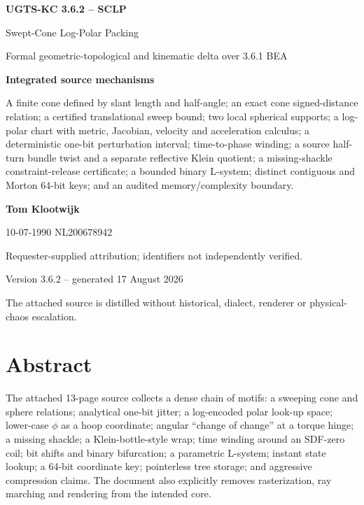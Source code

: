 \documentclass[10pt,a4paper]{article}
\begin{document}

\begin{titlepage}
\pagecolor{UGTSNavy}
\color{white}
\vspace*{9mm}
{\sffamily\bfseries\fontsize{34}{39}\selectfont UGTS-KC 3.6.2 -- SCLP\par}
\vspace{4mm}
{\sffamily\fontsize{21}{25}\selectfont Swept-Cone Log-Polar Packing\par}
\vspace{6mm}
{\sffamily\large Formal geometric-topological and kinematic delta over 3.6.1 BEA\par}
\vspace{12mm}

\begin{tcolorbox}[enhanced,colback=white,colframe=UGTSTeal,boxrule=1.2pt,arc=2mm,left=5mm,right=5mm,top=4mm,bottom=4mm]
\color{UGTSDark}
\textbf{Integrated source mechanisms}\par
A finite cone defined by slant length and half-angle; an exact cone signed-distance relation; a certified translational sweep bound; two local spherical supports; a log-polar chart with metric, Jacobian, velocity and acceleration calculus; a deterministic one-bit perturbation interval; time-to-phase winding; a source half-turn bundle twist and a separate reflective Klein quotient; a missing-shackle constraint-release certificate; a bounded binary L-system; distinct contiguous and Morton 64-bit keys; and an audited memory/complexity boundary.
\end{tcolorbox}

\vfill
{\sffamily\Large\bfseries Tom Klootwijk\par}
{\sffamily\large 10-07-1990 \quad NL200678942\par}
\vspace{3mm}
{\sffamily\small Requester-supplied attribution; identifiers not independently verified.\par}
\vspace{9mm}
{\sffamily\small Version 3.6.2 -- generated 17 August 2026\par}
{\sffamily\small The attached source is distilled without historical, dialect, renderer or physical-chaos escalation.\par}
\end{titlepage}
\nopagecolor
\color{UGTSDark}

\section*{Abstract}
The attached 13-page source collects a dense chain of motifs: a sweeping cone and sphere relations; analytical one-bit jitter; a log-encoded polar look-up space; lower-case $\phi$ as a hoop coordinate; angular ``change of change'' at a torque hinge; a missing shackle; a Klein-bottle-style wrap; time winding around an SDF-zero coil; bit shifts and binary bifurcation; a parametric L-system; instant state lookup; a 64-bit coordinate key; pointerless tree storage; and aggressive compression claims. The document also explicitly removes rasterization, ray marching and rendering from the intended core.
\end{document}
